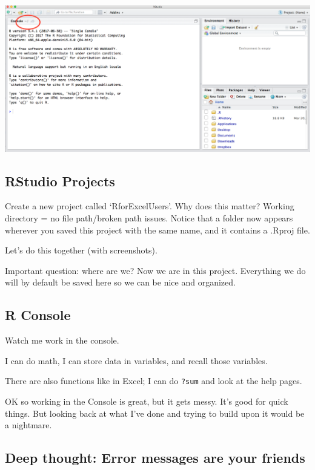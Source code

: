\documentclass[]{book}
\begin{document}
\includegraphics{img/RStudio_IDE_homedir.png}

\hypertarget{rstudio-projects}{%
\subsection{RStudio Projects}\label{rstudio-projects}}

Create a new project called `RforExcelUsers'. Why does this matter? Working directory = no file path/broken path issues. Notice that a folder now appears wherever you saved this project with the same name, and it contains a .Rproj file.

Let's do this together (with screenshots).

Important question: where are we? Now we are in this project. Everything we do will by default be saved here so we can be nice and organized.

\hypertarget{r-console}{%
\subsection{R Console}\label{r-console}}

Watch me work in the console.

I can do math, I can store data in variables, and recall those variables.

There are also functions like in Excel; I can do \texttt{?sum} and look at the help pages.

OK so working in the Console is great, but it gets messy. It's good for quick things. But looking back at what I've done and trying to build upon it would be a nightmare.

\hypertarget{deep-thought-error-messages-are-your-friends}{%
\subsection{Deep thought: Error messages are your friends}\label{deep-thought-error-messages-are-your-friends}}
\end{document}
